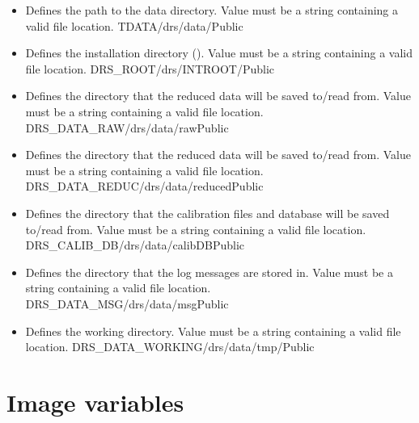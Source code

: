 \begin{itemize}

\item {}
{Defines the path to the data directory. Value must be a string containing a valid file location.}
{TDATA}{/drs/data/}{\AllRecipes}{\configtxtfile}{\spirouCONST}{Public}


\item {}
{Defines the installation directory (\InstallDIR). Value must be a string containing a valid file location.}
{DRS\_ROOT}{/drs/INTROOT/}{\AllRecipes}{\configtxtfile}{\spirouCONST}{Public}


\item {}
{Defines the directory that the reduced data will be saved to/read from. Value must be a string containing a valid file location.}
{DRS\_DATA\_RAW}{/drs/data/raw}{\AllRecipes}{\configtxtfile}{\spirouCONST}{Public}


\item {}
{Defines the directory that the reduced data will be saved to/read from. Value must be a string containing a valid file location.}
{DRS\_DATA\_REDUC}{/drs/data/reduced}{\AllRecipes}{\configtxtfile}{\spirouCONST}{Public}


\item {}
{Defines the directory that the calibration files and database will be saved to/read from. Value must be a string containing a valid file location.}
{DRS\_CALIB\_DB}{/drs/data/calibDB}{\AllRecipes}{\configtxtfile}{\spirouCONST}{Public}


\item {}
{Defines the directory that the log messages are stored in. Value must be a string containing a valid file location.}
{DRS\_DATA\_MSG}{/drs/data/msg}{\AllRecipes}{\configtxtfile}{\spirouCONST}{Public}


\item {}
{Defines the working directory. Value must be a string containing a valid file location.}
{DRS\_DATA\_WORKING}{/drs/data/tmp/}{\AllRecipes}{\configtxtfile}{\spirouCONST}{Public}


\end{itemize}

\section{Image variables}
\label{ch:variables:image}

